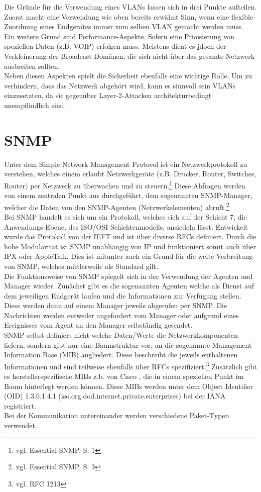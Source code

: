 Die Gründe für die Verwendung eines VLANs lassen sich in drei Punkte aufteilen.
Zuerst macht eine Verwendung wie oben bereits erwähnt Sinn, wenn eine flexible Zuordnung eines Endgerätes immer zum selben VLAN gemacht werden muss.\\
Ein weitere Grund sind Performance-Aspekte. Sofern eine Prioisierung von speziellen Daten (z.B. VOIP) erfolgen muss. Meistens dient es jdoch der Verkleinerung der Broadcast-Domänen, die sich nicht über das gesamte Netzwerk ausbreiten sollten.\\
Neben diesen Aspekten spielt die Sicherheit ebenfalls eine wichtige Rolle. Um zu verhindern, dass das Netzwerk abgehört wird, kann es sinnvoll sein VLANs einzusetzten, da sie gegenüber Layer-2-Attacken architekturbedingt unempflindlich sind.


\section{SNMP}
\label{sec:snmp}
Unter dem Simple Network Management Protocol ist ein Netzwerkprotokoll zu verstehen, welches einem erlaubt Netzwerkgeräte (z.B. Drucker, Router, Switches, Router) per Netzwerk zu überwachen und zu steuern.\footnote{vgl. Essential SNMP, S. 1}
Diese Abfragen werden von einem zentralen Punkt aus durchgeführt, dem sogenannten SNMP-Manager, welcher die Daten von den SNMP-Agenten (Netzwerkelementen) abruft.\footnote{vgl. Essential SNMP, S. 3}\\
Bei SNMP handelt es sich um ein Protokoll, welches sich auf der Schicht 7, die Anwendungs-Ebene, des ISO/OSI-Schichtenmodells, ansiedeln lässt.
Entwickelt wurde das Protokoll von der IEFT und ist über diverse RFCs definiert.
Durch die hohe Modularität ist SNMP unabhängig von IP und funktioniert somit auch über IPX oder AppleTalk. Dies ist mitunter auch ein Grund für die weite Verbreitung von SNMP, welches mittlerweile als Standard gilt.\\
Die Funktionsweise von  SNMP spiegelt sich in der Verwendung der Agenten und Manager wieder.
Zunächst gibt es die sogenannten Agenten welche als Dienst auf dem jeweiligen Endgerät laufen und die Informationen zur Verfügung stellen. Diese werden dann auf einem Manager jeweils abgerufen per SNMP. Die Nachrichten werden entweder angefordert vom Manager oder aufgrund eines Ereignisses vom Agent an den Manager selbständig gesendet.\\
SNMP selbst definiert nicht welche Daten/Werte die Netzwerkkomponenten liefern, sondern gibt nur eine Baumstruktur vor, an die sogenannte Management Information Base (MIB) angliedert.
Diese beschreibt die jeweils enthaltenen Informationen und sind teilweise ebenfalls über RFCs spezifiziert.\footnote{vgl. RFC 1213} Zusätzlich gibt es herstellerspezifische MIBs z.b. von Cisco , die in einem speziellen Punkt im Baum hinterlegt werden können. Diese MIBs werden unter dem  Object Identifier (OID) 1.3.6.1.4.1 (iso.org.dod.internet.private.enterprises) bei der IANA registriert.\\
Bei der Kommunikation untereinander werden verschiedene Paket-Typen verwendet.

